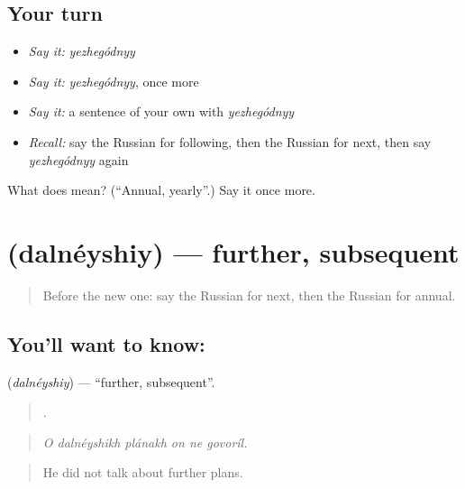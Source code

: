 \subsection*{Your turn}
\begin{itemize}
\raggedright
  \item \emph{Say it:} \emph{yezhegódnyy}
  \item \emph{Say it:} \emph{yezhegódnyy}, once more
  \item \emph{Say it:} a sentence of your own with \emph{yezhegódnyy}
  \item \emph{Recall:} say the Russian for following, then the Russian for next, then say \emph{yezhegódnyy} again
\end{itemize}

\begin{tcolorbox}[breakable,colback=teal!4,colframe=teal!35!black,title={Before you move on}]
What does  mean? (\textquotedblleft{}Annual, yearly\textquotedblright{}.) Say it once more.
\end{tcolorbox}
\section[\texorpdfstring{\ru{дальнейший} (dalnéyshiy)}{дальнейший (dalnéyshiy)}]{ (dalnéyshiy) — further, subsequent}

\label{lesson:RU-C277-dalneyshiy}



\begin{quote}
Before the new one: say the Russian for next, then the Russian for annual.
\end{quote}

\subsection*{You'll want to know: }
\textbf{} (\emph{dalnéyshiy}) — \textquotedblleft{}further, subsequent\textquotedblright{}.

\begin{quote}
     .
\end{quote}

\begin{quote}
\emph{O dalnéyshikh plánakh on ne govoríl.}
\end{quote}

\begin{quote}
He did not talk about further plans.
\end{quote}

